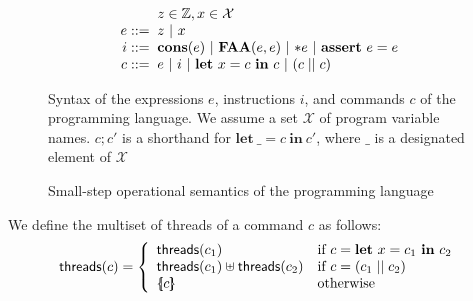 \documentclass{article}
\newcommand{\llbrace}{\{\hspace{-3pt}[}
\newcommand{\rrbrace}{]\hspace{-3pt}\}}
\begin{document}
\begin{figure}
$$\begin{array}{r @{\;} @{\;} l}
& z \in \mathbb{Z}, x \in \mathcal{X}\\
e ::= & z\ |\ x\\
i ::= & \mathbf{cons}(e)\ |\ \mathbf{FAA}(e, e)\ |\ {*}e\ |\ \mathbf{assert}\ e = e\\
c ::= & e\ |\ i\ |\ \mathbf{let}\ x = c\ \mathbf{in}\ c\ |\ (c\;||\;c)
\end{array}$$
\caption{Syntax of the expressions $e$, instructions $i$, and commands $c$ of the programming language. We assume a set $\mathcal{X}$ of program variable names. $c; c'$ is a shorthand for $\mathbf{let}\ \_ = c\ \mathbf{in}\ c'$, where $\_$ is a designated element of $\mathcal{X}$}\label{fig:program-syntax}
\end{figure}

\begin{figure}
\caption{Small-step operational semantics of the programming language}\label{fig:program-steps}
\end{figure}

We define the multiset of threads of a command $c$ as follows:
$$\mathsf{threads}(c) = \left\{\begin{array}{l l}
\mathsf{threads}(c_1) & \textrm{if $c = \mathbf{let}\ x = c_1\ \mathbf{in}\ c_2$}\\
\mathsf{threads}(c_1) \uplus \mathsf{threads}(c_2) & \textrm{if $c = (c_1\;||\;c_2)$}\\
\llbrace c\rrbrace & \textrm{otherwise}
\end{array}\right.$$
\end{document}
